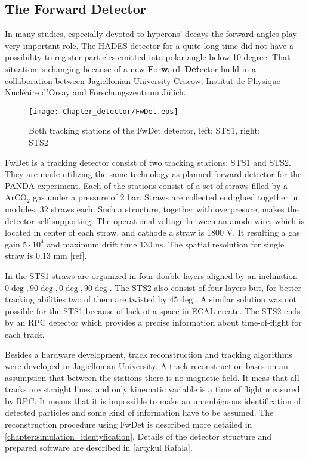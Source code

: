 \subsection{The Forward Detector}
\label{subsec:FwDet}
In many studies, especially devoted to hyperons' decays the forward angles play very important role. The HADES detector for a quite long time did not have a possibility to register particles emitted into polar angle below 10 degree. That situation is changing because of a new \textbf{F}or\textbf{w}ard~\textbf{Det}ector build in a collaboration between Jagiellonian University Cracow, Institut de Physique Nucléaire d'Orsay and Forschungszentrum Jülich.

\begin{figure}[hb]
  \centering
  \texttt{[image: Chapter\_detector/FwDet.eps]}
  \caption{Both tracking stations of the FwDet detector, left: STS1, right: STS2}
\end{figure}

FwDet is a tracking detector consist of two tracking stations: STS1 and STS2. They are made utilizing the same technology as planned forward detector for the PANDA experiment. Each of the stations consist of a set of straws filled by a ArCO$_2$ gas under a pressure of 2 bar. Straws are collected end glued together in modules, 32 straws each. Such a structure, together with overpresure, makes the detector self-supporting. The operational voltage between an anode wire, which is located in center of each straw, and cathode a straw is 1800 V. It resulting a gas gain $5 \cdot 10^4$ and maximum drift time 130 ns. The spatial resolution for single straw is 0.13 mm [ref].

In the STS1 straws are organized in four double-layers aligned by an inclination $0\deg, 90\deg, 0\deg, 90\deg$. The STS2 also consist of four layers but, for better tracking abilities two of them are twisted by $45\deg$. A similar solution was not possible for the STS1 because of lack of a space in ECAL create. The STS2 ends by an RPC detector which provides a precise information about time-of-flight for each track.

Besides a hardware development, track reconstruction and tracking algorithms were developed in Jagiellonian University. A track reconstruction bases on an assumption that between the stations there is no magnetic field. It meas that all tracks are straight lines, and only kinematic variable is a time of flight measured by RPC. It means that it is impossible to make an unambiguous identification of detected particles and some kind of information have to be assumed. The reconstruction procedure using FwDet is described more detailed in \ref{chapter:simulation_identyfication}. Details of the detector structure and prepared software are described in [artykul Rafala]. 
